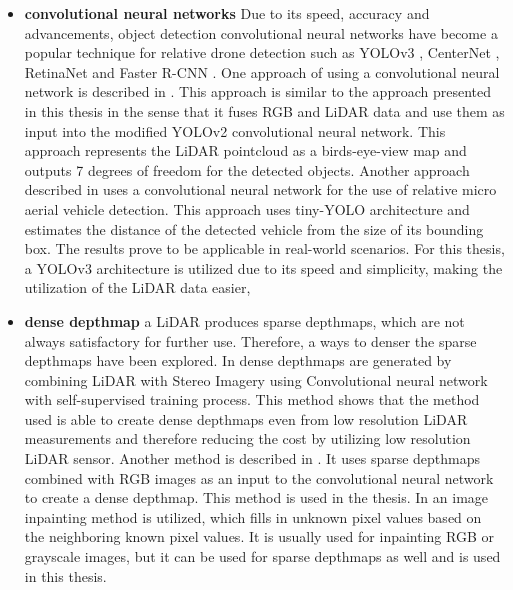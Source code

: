 \documentclass[twoside]{ctuthesis}
\theoremstyle{plain}
\theoremstyle{definition}
\theoremstyle{note}
\begin{document}
\begin{itemize}
	\item \textbf{convolutional neural networks} Due to its speed, accuracy and advancements, object detection convolutional neural networks have become a popular technique for relative drone detection such as YOLOv3 \cite{redmon2018yolov3}, CenterNet \cite{zhou2019objects}, RetinaNet \cite{lin2018focal} and Faster R-CNN \cite{ren2016faster}. One approach of using a convolutional neural network is described in \cite{ali2018yolo3d}. This approach is similar to the approach presented in this thesis in the sense that it fuses RGB and LiDAR data and use them as input into the modified YOLOv2 \cite{redmon2016yolo9000} convolutional neural network. This approach represents the LiDAR pointcloud as a birds-eye-view map and outputs 7 degrees of freedom for the detected objects. Another approach described in \cite{8988144} uses a convolutional neural network for the use of relative micro aerial vehicle detection. This approach uses tiny-YOLO architecture \cite{redmon2016yolo9000} and estimates the distance of the detected vehicle from the size of its bounding box. The results prove to be applicable in real-world scenarios. For this thesis, a YOLOv3 architecture is utilized due to its speed and simplicity, making the utilization of the LiDAR data easier,
	\item \textbf{dense depthmap} a LiDAR produces sparse depthmaps, which are not always satisfactory for further use. Therefore, a ways to denser the sparse depthmaps have been explored. In \cite{zhang2020listereo} dense depthmaps are generated by combining LiDAR with Stereo Imagery using Convolutional neural network with self-supervised training process. This method shows that the method used is able to create dense depthmaps even from low resolution LiDAR measurements and therefore reducing the cost by utilizing low resolution LiDAR sensor. Another method is described in \cite{ma2018sparsetodense}. It uses sparse depthmaps combined with RGB images as an input to the convolutional neural network to create a dense depthmap. This method is used in the thesis. In \cite{cite:5} an image inpainting method is utilized, which fills in unknown pixel values based on the neighboring known pixel values. It is usually used for inpainting RGB or grayscale images, but it can be used for sparse depthmaps as well and is used in this thesis.
\end{itemize}
\end{document}
